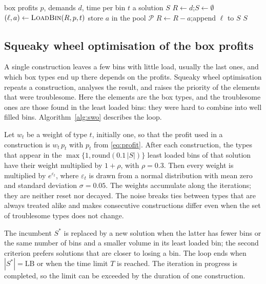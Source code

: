 \begin{algorithm}[t]
\caption{$\textsc{Construct}(p)$}
\label{alg:construct}
\begin{algorithmic}[1]
\Require box profits $p$, demands $d$, time per bin $t$
\Ensure a solution $S$
\State $R\gets d$;\quad $S\gets\emptyset$
  \State $(\ell,a)\gets \textsc{LoadBin}(R,p,t)$ 
  \State store $a$ in the pool $\mathcal{P}$ 
  \State $R\gets R-a$;\quad append $\ell$ to $S$
\EndWhile
\State \Return $S$
\end{algorithmic}
\end{algorithm}

\subsection{Squeaky wheel optimisation of the box profits}
\label{sec:m-swo}

A single construction leaves a few bins with little load, usually the last ones, and which box
types end up there depends on the profits. Squeaky wheel optimisation \citep{Joslin1999} repeats
a construction, analyses the result, and raises the priority of the elements that were
troublesome. Here the elements are the box types, and the troublesome ones are those found in
the least loaded bins: they were hard to combine into well filled bins. Algorithm~\ref{alg:swo}
describes the loop.

Let $w_t$ be a weight of type $t$, initially one, so that the profit used in a construction is
$w_t\,p_t$ with $p_t$ from \eqref{eq:profit}. After each construction, the types that appear in
the $\max\{1,\mathrm{round}(0.1\,|S|)\}$ least loaded bins of that solution have their weight multiplied by
$1+\rho$, with $\rho=0.3$. Then every weight is multiplied by $e^{\varepsilon_t}$, where
$\varepsilon_t$ is drawn from a normal distribution with mean zero and standard deviation
$\sigma=0.05$. The weights accumulate along the iterations; they are neither reset nor decayed.
The noise breaks ties between types that are always treated alike and makes consecutive
constructions differ even when the set of troublesome types does not change.

The incumbent $S^*$ is replaced by a new solution when the latter has fewer bins or the same
number of bins and a smaller volume in its least loaded bin; the second criterion prefers
solutions that are closer to losing a bin. The loop ends when $|S^*|=\mathrm{LB}$ or when the
time limit $T$ is reached. The iteration in progress is completed, so the limit can be exceeded
by the duration of one construction.

